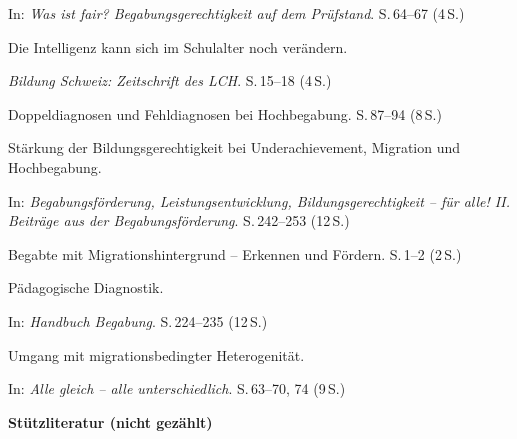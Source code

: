 \begin{description}
    In: \textit{Was ist fair? Begabungsgerechtigkeit auf dem Prüfstand}.
    S.\,64--67 (4\,S.)

  \item[\cite{stern2025intelligenz}] Die Intelligenz kann sich im Schulalter noch verändern.
    
    \textit{Bildung Schweiz: Zeitschrift des LCH}.
    S.\,15--18 (4\,S.)

  \item[\cite{webb2020doppeldiagnosen}] Doppeldiagnosen und Fehldiagnosen bei Hochbegabung.
    S.\,87--94 (8\,S.)

  \item[\cite{warneckehauke2020bildungsgerechtigkeit}] Stärkung der Bildungsgerechtigkeit bei Underachievement, Migration und Hochbegabung.
    
    In: \textit{Begabungsförderung, Leistungsentwicklung, Bildungsgerechtigkeit -- für alle! II. Beiträge aus der Begabungsförderung}.
    S.\,242--253 (12\,S.)

  \item[\cite{kellerkoller2011erkennen}] Begabte mit Migrationshintergrund -- Erkennen und Fördern.
    S.\,1--2 (2\,S.)

  \item[\cite{muelleroppliger2021paeddiagnostik}] Pädagogische Diagnostik.
    
    In: \textit{Handbuch Begabung}.
    S.\,224--235 (12\,S.)

  \item[\cite{kappus2010migration}] Umgang mit migrationsbedingter Heterogenität.
    
    In: \textit{Alle gleich -- alle unterschiedlich}.
    S.\,63--70, 74 (9\,S.)

\end{description}

\textbf{Stützliteratur (nicht gezählt)}

